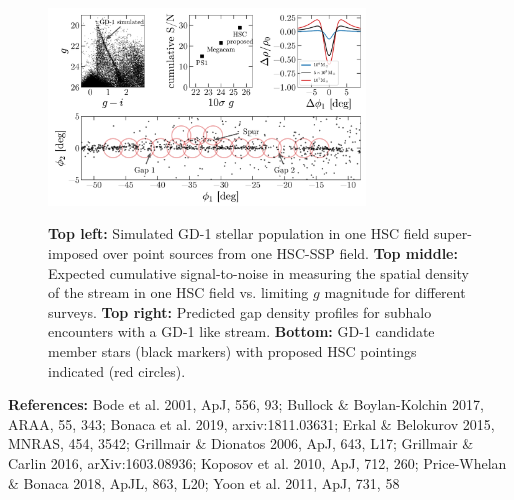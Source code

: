 \documentclass[11pt]{article}
\begin{document}
\begin{figure}[t]
\begin{center}
\includegraphics[width=0.75\textwidth]{figure1.pdf}
\caption{
\textbf{Top left:} Simulated GD-1 stellar population in one HSC field super-imposed over point sources from one HSC-SSP field.
\textbf{Top middle:} Expected cumulative signal-to-noise in measuring the spatial density of the stream in one HSC field vs. limiting $g$ magnitude for different surveys.
\textbf{Top right:} Predicted gap density profiles for subhalo encounters with a GD-1 like stream.
\textbf{Bottom:} GD-1 candidate member stars (black markers) with proposed HSC pointings indicated (red circles).
}
\vspace{-2.2em}
\label{fig:}
\end{center}
\end{figure}

{%
\textbf{References:}
Bode et al. 2001, ApJ, 556, 93;
Bullock \& Boylan-Kolchin 2017, ARAA, 55, 343;
Bonaca et al. 2019, arxiv:1811.03631;
Erkal \& Belokurov 2015, MNRAS, 454, 3542;
Grillmair \& Dionatos 2006, ApJ, 643, L17;
Grillmair \& Carlin 2016, arXiv:1603.08936;
Koposov et al. 2010, ApJ, 712, 260;
Price-Whelan \& Bonaca 2018, ApJL, 863, L20;
Yoon et al. 2011, ApJ, 731, 58}
\end{document}
